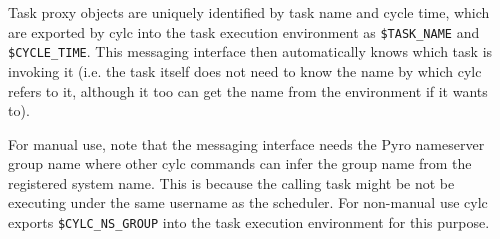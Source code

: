 
Task proxy objects are uniquely identified by task name and cycle time,
which are exported by cylc into the task execution environment as
\lstinline=$TASK_NAME= and \lstinline=$CYCLE_TIME=. This messaging
interface then automatically knows which task is invoking it (i.e. the
task itself does not need to know the name by which cylc refers to it,
although it too can get the name from the environment if it wants to).

For manual use, note that the messaging interface needs the Pyro
nameserver group name where other cylc commands can infer the group name
from the registered system name. This is because the calling task might
be not be executing under the same username as the scheduler. For
non-manual use cylc exports \lstinline=$CYLC_NS_GROUP= into the task
execution environment for this purpose. 
